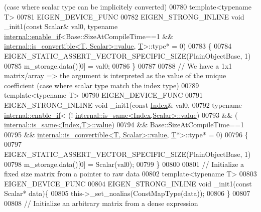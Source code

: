 \begin{DoxyCode}
{       (case where scalar type can be implicitely converted)}
00780     \textcolor{keyword}{template}<\textcolor{keyword}{typename} T>
00781     EIGEN\_DEVICE\_FUNC
00782     EIGEN\_STRONG\_INLINE \textcolor{keywordtype}{void} \_init1(\textcolor{keyword}{const} Scalar& val0, \textcolor{keyword}{typename} 
      \hyperlink{struct_eigen_1_1internal_1_1enable__if}{internal::enable\_if}<Base::SizeAtCompileTime==1 && 
      \hyperlink{struct_eigen_1_1internal_1_1is__convertible}{internal::is\_convertible<T, Scalar>::value},
      \hyperlink{group___sparse_core___module}{T}>::type* = 0)
00783     \{
00784       EIGEN\_STATIC\_ASSERT\_VECTOR\_SPECIFIC\_SIZE(PlainObjectBase, 1)
00785       m\_storage.data()[0] = val0;
00786     \}
00787     
00788     \textcolor{comment}{// We have a 1x1 matrix/array => the argument is interpreted as the value of the unique coefficient
       (case where scalar type match the index type)}
00789     \textcolor{keyword}{template}<\textcolor{keyword}{typename} T>
00790     EIGEN\_DEVICE\_FUNC
00791     EIGEN\_STRONG\_INLINE \textcolor{keywordtype}{void} \_init1(\textcolor{keyword}{const} \hyperlink{namespace_eigen_a62e77e0933482dafde8fe197d9a2cfde}{Index}& val0,
00792                                     \textcolor{keyword}{typename} \hyperlink{struct_eigen_1_1internal_1_1enable__if}{internal::enable\_if}<    (!
      \hyperlink{struct_eigen_1_1internal_1_1is__same}{internal::is\_same<Index,Scalar>::value})
00793                                                                   && (
      \hyperlink{struct_eigen_1_1internal_1_1is__same}{internal::is\_same<Index,T>::value})
00794                                                                   && Base::SizeAtCompileTime==1
00795                                                                   && 
      \hyperlink{struct_eigen_1_1internal_1_1is__convertible}{internal::is\_convertible<T, Scalar>::value},
      \hyperlink{group___sparse_core___module}{T}*>::type* = 0)
00796     \{
00797       EIGEN\_STATIC\_ASSERT\_VECTOR\_SPECIFIC\_SIZE(PlainObjectBase, 1)
00798       m\_storage.data()[0] = Scalar(val0);
00799     \}
00800 
00801     \textcolor{comment}{// Initialize a fixed size matrix from a pointer to raw data}
00802     \textcolor{keyword}{template}<\textcolor{keyword}{typename} T>
00803     EIGEN\_DEVICE\_FUNC
00804     EIGEN\_STRONG\_INLINE \textcolor{keywordtype}{void} \_init1(\textcolor{keyword}{const} Scalar* data)\{
00805       this->\_set\_noalias(ConstMapType(data));
00806     \}
00807 
00808     \textcolor{comment}{// Initialize an arbitrary matrix from a dense expression}

\end{DoxyCode}

